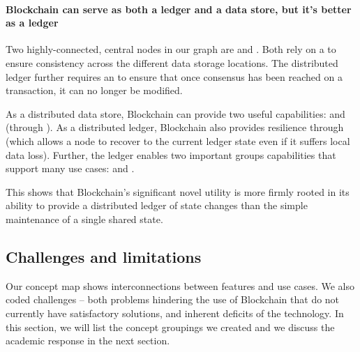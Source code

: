 {\paragraph{Blockchain can serve as both a ledger and a data store, but it's better as a ledger}
Two highly-connected, central nodes in our graph are  and . Both rely on a  to ensure consistency across the different data storage locations. The distributed ledger further requires an  to ensure that once consensus has been reached on a transaction, it can no longer be modified. 

As a distributed data store, Blockchain can provide two useful capabilities:  and  (through ). As a distributed ledger, Blockchain also provides resilience through  (which allows a node to recover to the current ledger state even if it suffers local data loss). Further, the ledger enables two important groups capabilities that support many use cases:  and . 

This shows that Blockchain's significant novel utility is more firmly rooted in its ability to provide a distributed ledger of state changes than the simple maintenance of a single shared state.




\subsection{Challenges and limitations}
\label{subsec:challenges}


Our concept map shows interconnections between features and use cases. We also coded challenges -- both problems hindering the use of Blockchain that do not currently have satisfactory solutions, and inherent deficits of the technology. In this section, we will list the concept groupings we created and we discuss the academic response in the next section.
}
